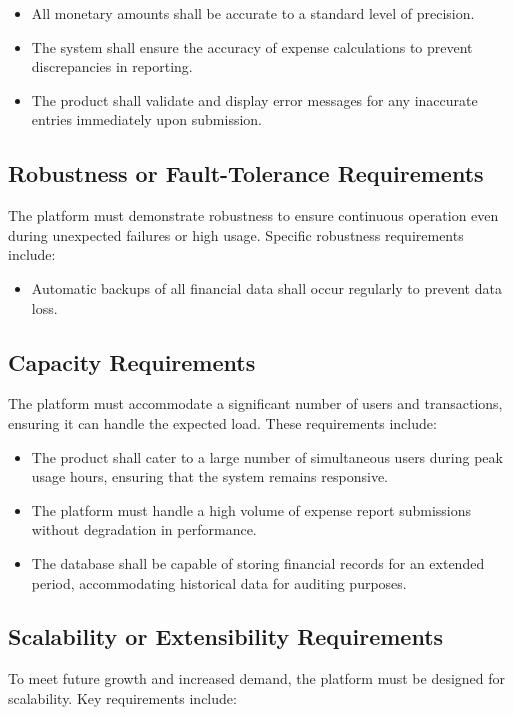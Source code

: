 \documentclass[12pt]{article}
\begin{document}
\begin{itemize}
    \item All monetary amounts shall be accurate to a standard level of precision.
    \item The system shall ensure the accuracy of expense calculations to prevent discrepancies in reporting.
    \item The product shall validate and display error messages for any inaccurate entries immediately upon submission.
\end{itemize}

\subsection{Robustness or Fault-Tolerance Requirements}
The platform must demonstrate robustness to ensure continuous operation even during unexpected failures or high usage. Specific robustness requirements include:

\begin{itemize}
    \item Automatic backups of all financial data shall occur regularly to prevent data loss.
\end{itemize}

\subsection{Capacity Requirements}
The platform must accommodate a significant number of users and transactions, ensuring it can handle the expected load. These requirements include:

\begin{itemize}
    \item The product shall cater to a large number of simultaneous users during peak usage hours, ensuring that the system remains responsive.
    \item The platform must handle a high volume of expense report submissions without degradation in performance.
    \item The database shall be capable of storing financial records for an extended period, accommodating historical data for auditing purposes.
\end{itemize}

\subsection{Scalability or Extensibility Requirements}
To meet future growth and increased demand, the platform must be designed for scalability. Key requirements include:
\end{document}
